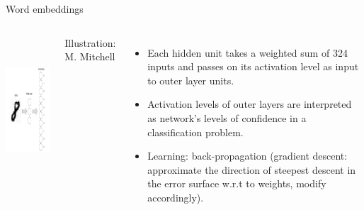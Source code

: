 \documentclass[
  10pt,
  ignorenonframetext,
  x11names, dvipsnames, bibspacing,natbib, table]{beamer}
\begin{document}
\begin{frame}{Word embeddings}
\protect\hypertarget{word-embeddings-3}{}
\begin{columns}
    
    

\begin{center}
 \includegraphics[height = 5.5cm, width = 5cm]{images/perceptron2.png}
\end{center}


\vspace{2mm}
\tiny \hfill \color{gray}Illustration: M. Mitchell \color{black}




\footnotesize 

\begin{itemize}
\item Each hidden unit takes a weighted sum of 324 inputs and passes on its activation level as input to outer layer units. 

\item Activation levels of outer layers are interpreted as network's levels of confidence in a classification problem.

\item Learning: back-propagation (gradient descent: approximate  the direction of steepest descent in the error surface w.r.t to weights, modify accordingly).
\end{itemize}

\end{columns}
\end{frame}
\end{document}

